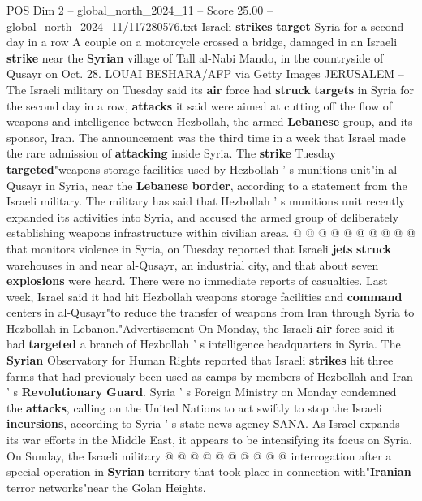 \begin{textsample}{POS Dim 2 – global\_north\_2024\_11 – Score 25.00 – global\_north\_2024\_11/117280576.txt}  \label{ex:f2_pos_254}
Israeli \textbf{strikes} \textbf{target} Syria for a second day in a row A couple on a motorcycle crossed a bridge, damaged in an Israeli \textbf{strike} near the \textbf{Syrian} village of Tall al-Nabi Mando, in the countryside of Qusayr on Oct. 28.
LOUAI BESHARA/AFP via Getty Images JERUSALEM -- The Israeli military on Tuesday said its \textbf{air} force had \textbf{struck} \textbf{targets} in Syria for the second day in a row, \textbf{attacks} it said were aimed at cutting off the flow of weapons and intelligence between Hezbollah, the armed \textbf{Lebanese} group, and its sponsor, Iran.
The announcement was the third time in a week that Israel made the rare admission of \textbf{attacking} inside Syria.
The \textbf{strike} Tuesday \textbf{targeted}"weapons storage facilities used by Hezbollah ' s munitions unit"in al-Qusayr in Syria, near the \textbf{Lebanese} \textbf{border}, according to a statement from the Israeli military.
The military has said that Hezbollah ' s munitions unit recently expanded its activities into Syria, and accused the armed group of deliberately establishing weapons infrastructure within civilian areas. @ @ @ @ @ @ @ @ @ @ that monitors violence in Syria, on Tuesday reported that Israeli \textbf{jets} \textbf{struck} warehouses in and near al-Qusayr, an industrial city, and that about seven \textbf{explosions} were heard.
There were no immediate reports of casualties.
Last week, Israel said it had hit Hezbollah weapons storage facilities and \textbf{command} centers in al-Qusayr"to reduce the transfer of weapons from Iran through Syria to Hezbollah in Lebanon."Advertisement On Monday, the Israeli \textbf{air} force said it had \textbf{targeted} a branch of Hezbollah ' s intelligence headquarters in Syria.
The \textbf{Syrian} Observatory for Human Rights reported that Israeli \textbf{strikes} hit three farms that had previously been used as camps by members of Hezbollah and Iran ' s \textbf{Revolutionary} \textbf{Guard}.
Syria ' s Foreign Ministry on Monday condemned the \textbf{attacks}, calling on the United Nations to act swiftly to stop the Israeli \textbf{incursions}, according to Syria ' s state news agency SANA.
As Israel expands its war efforts in the Middle East, it appears to be intensifying its focus on Syria.
On Sunday, the Israeli military @ @ @ @ @ @ @ @ @ @ interrogation after a special operation in \textbf{Syrian} territory that took place in connection with"\textbf{Iranian} terror networks"near the Golan Heights.

\end{textsample}
